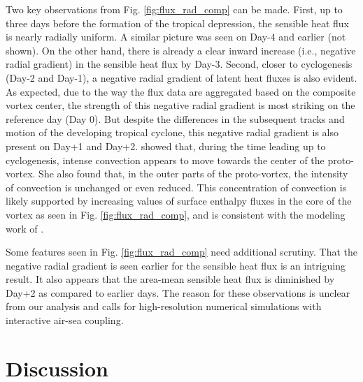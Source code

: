 \documentclass[draft]{agujournal2019}
\begin{document}
Two key observations from Fig. \ref{fig:flux_rad_comp} can be made. First, up to three days before the formation of the tropical depression, the sensible heat flux is nearly radially uniform. A similar picture was seen on  Day-4 and earlier (not shown). On the other hand, there is already a clear inward increase  (i.e., negative radial gradient) in the sensible heat flux by Day-3. Second, closer to cyclogenesis (Day-2 and Day-1), a negative radial gradient of latent heat fluxes is also evident. As expected, due to the way the flux data are aggregated based on the composite vortex center, the strength of this negative radial gradient is most striking on the reference day (Day 0). But despite the differences in the subsequent tracks and motion of the developing tropical cyclone, this negative radial gradient is also present on Day+1 and Day+2.  showed that, during the time leading up to cyclogenesis, intense convection appears to move towards the center of the proto-vortex. She also found that, in the outer parts of the proto-vortex, the intensity of convection is unchanged or even reduced. This concentration of convection is likely supported by increasing values of surface enthalpy fluxes in the core of the vortex as seen in Fig. \ref{fig:flux_rad_comp}, and is consistent with the modeling work of . 

Some features seen in Fig. \ref{fig:flux_rad_comp} need additional scrutiny. That the negative radial gradient is seen earlier for the sensible heat flux is an intriguing result. It also appears that the area-mean sensible heat flux is diminished by Day+2 as compared to earlier days. The reason for these observations is unclear from our analysis and calls for high-resolution numerical simulations with interactive air-sea coupling.
\section{Discussion}


\end{document}
